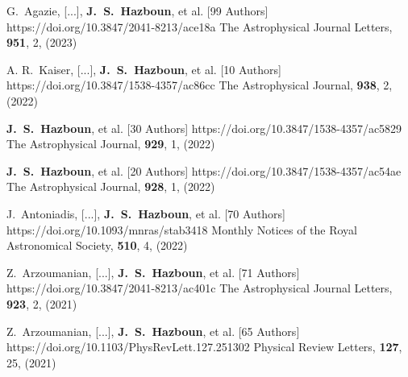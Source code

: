         {G.~{Agazie}, [...], \textbf{J.~S.~{Hazboun}}, et al. [99 Authors]}
         {https://doi.org/10.3847/2041-8213/ace18a}
         {{The Astrophysical Journal Letters}, \textbf{951}, 2, (2023)}

         {A. R.~{Kaiser}, [...], \textbf{J.~S.~{Hazboun}}, et al. [10 Authors]}
         {https://doi.org/{10.3847/1538-4357/ac86cc}}
         {{The Astrophysical Journal}, \textbf{{938}}, {2}, (2022)}

         {\textbf{J.~S.~{Hazboun}}, et al. [30 Authors]}
         {https://doi.org/10.3847/1538-4357/ac5829}
         {{The Astrophysical Journal}, \textbf{929}, 1, (2022)}

         {\textbf{J.~S.~{Hazboun}}, et al. [20 Authors]}
         {https://doi.org/10.3847/1538-4357/ac54ae}
         {{The Astrophysical Journal}, \textbf{928}, 1, (2022)}

         {J.~{Antoniadis}, [...], \textbf{J.~S.~{Hazboun}}, et al. [70 Authors]}
         {https://doi.org/10.1093/mnras/stab3418}
         {{Monthly Notices of the Royal Astronomical Society}, \textbf{510}, 4, (2022)}

         {Z.~{Arzoumanian}, [...], \textbf{J.~S.~{Hazboun}}, et al. [71 Authors]}
         {https://doi.org/10.3847/2041-8213/ac401c}
         {{The Astrophysical Journal Letters}, \textbf{923}, 2, (2021)}

         {Z.~{Arzoumanian}, [...], \textbf{J.~S.~{Hazboun}}, et al. [65 Authors]}
         {https://doi.org/10.1103/PhysRevLett.127.251302}
         {{Physical Review Letters}, \textbf{127}, 25, (2021)}

